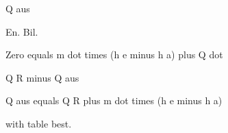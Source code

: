 Q aus

En. Bil.

Zero equals m dot times (h e minus h a) plus Q dot

Q R minus Q aus

Q aus equals Q R plus m dot times (h e minus h a)

with table best.